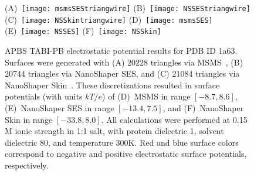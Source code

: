 \documentclass[12pt,titlepage]{article}
\newcommand{\revision}[1]{#1}
\begin{document}
\begin{figure}
	\centering
	\hspace{-5pt}
	(A)~\hspace{-3pt}\texttt{[image: msmsSEStriangwire]} 
	\hspace{-10pt}
	(B)~\hspace{-3pt}\texttt{[image: NSSEStriangwire]}
	\hspace{-10pt} 
	(C)~\hspace{-3pt}\texttt{[image: NSSkintriangwire]}
	\hspace{-5pt}
	(D)~\hspace{-3pt}\texttt{[image: msmsSES]} 
	\hspace{-10pt}
	(E)~\hspace{-3pt}\texttt{[image: NSSES]}
	\hspace{-10pt} 
	(F)~\hspace{-3pt}\texttt{[image: NSSkin]}
	\hspace{-5pt}
	\caption{APBS TABI-PB electrostatic potential results for PDB ID 1a63.
		Surfaces were generated with (A) 20228 triangles via MSMS~\cite{Sanner1995}, (B) 20744 triangles via NanoShaper SES, and (C) 21084 triangles via NanoShaper Skin~\cite{Decherchi2013}.
		These discretizations resulted in surface potentials (with units $kT/e$) of (D)~MSMS in range $[-8.7, 8.6]$, (E)~NanoShaper SES in range $[-13.4, 7.5]$, and (F)~NanoShaper Skin in range $[-33.8, 8.0]$.
		All calculations were performed at 0.15 M ionic strength in 1:1 salt, with protein dielectric 1, solvent dielectric 80, and temperature 300K.
		\revision{Red and blue surface colors correspond to negative and positive electrostatic surface potentials, respectively.}
		\label{fig:surface-potential}
		\label{fig:surface-mesher}}
\end{figure}
\end{document}
